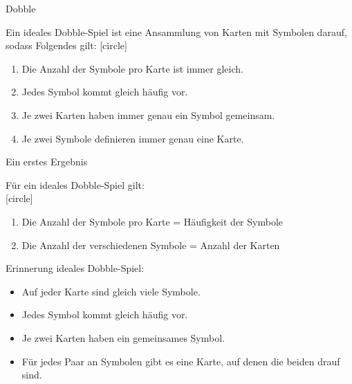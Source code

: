 \documentclass[11pt, aspectratio=169, xcolor={dvipsnames}]{beamer} %
\newcommand{\green}{\textcolor{ForestGreen!80!black}}
\theoremstyle{plain}
\theoremstyle{definition}
\begin{document}
\begin{frame}{Dobble}
	\begin{defbox*}{}{}
		Ein ideales Dobble-Spiel ist eine Ansammlung von Karten mit Symbolen darauf, sodass Folgendes gilt:
		[circle]
		\begin{enumerate}%
			\item Die Anzahl der Symbole pro Karte ist immer gleich.
			\item Jedes Symbol kommt gleich häufig vor.
			\item Je zwei Karten haben immer genau ein Symbol gemeinsam.
			\item Je zwei Symbole definieren immer genau eine Karte.
		\end{enumerate}
	\end{defbox*}
\end{frame}

\begin{frame}{Ein erstes Ergebnis}
	\begin{lemmabox*}{}{}
		Für ein ideales Dobble-Spiel gilt: \\[-11pt]
		[circle]
		\begin{enumerate}\setlength \parskip{8pt}
			\item Die Anzahl der Symbole pro Karte  =  Häufigkeit der Symbole 
			\item Die Anzahl der verschiedenen Symbole  =  Anzahl der Karten 
		\end{enumerate}      
	\end{lemmabox*}
	\begin{greenbox}
		\green{Erinnerung ideales Dobble-Spiel:}
		\begin{itemize}
			\item Auf jeder Karte sind gleich viele Symbole.
			\item Jedes Symbol kommt gleich häufig vor. 
			\item Je zwei Karten haben ein gemeinsames Symbol. 
			\item Für jedes Paar an Symbolen gibt es eine Karte, auf denen die beiden drauf sind. 
		\end{itemize}
	\end{greenbox}
\end{frame}
\end{document}
